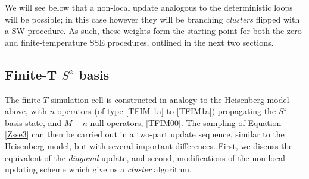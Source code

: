 \documentclass[vecphys]{svmult}
\begin{document}
We will see below that a non-local update analogous to the deterministic loops will be possible; in this case however they will be branching {\it clusters} flipped with a SW procedure.  As such, these weights form the starting point for both the zero- and finite-temperature SSE procedures, outlined in the next two sections.

\subsection{Finite-T $S^z$ basis} \label{Melko:TFIMfiniteT}

The finite-$T$ simulation cell is constructed in analogy to the Heisenberg model above, with $n$ operators (of type \ref{TFIM-1a} to \ref{TFIM1a}) propagating the $S^z$ basis state, and $M-n$ null operators, \ref{TFIM00}.
The sampling of Equation \ref{Zsse3} can then be carried out in a two-part update sequence, similar to the Heisenberg model, but with several important differences.  First, we discuss the equivalent of the {\em diagonal} update, and second, modifications of the non-local updating scheme which give us a {\em cluster} algorithm.
\end{document}
